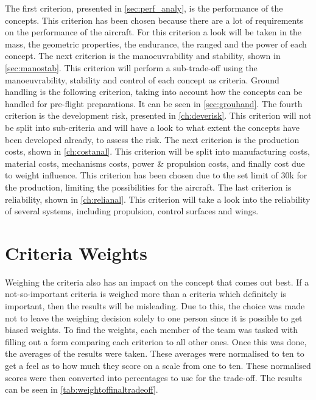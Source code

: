 The first criterion, presented in \autoref{sec:perf_analy}, is the performance of the concepts. This criterion has been chosen because there are a lot of requirements on the performance of the aircraft. For this criterion a look will be taken in the mass, the geometric properties, the endurance, the ranged and the power of each concept. The next criterion is the manoeuvrability and stability, shown in \autoref{sec:manostab}. This criterion will perform a sub-trade-off using the manoeuvrability, stability and control of each concept as criteria. Ground handling is the following criterion, taking into account how the concepts can be handled for pre-flight preparations. It can be seen in \autoref{sec:grouhand}. The fourth criterion is the development risk, presented in \autoref{ch:deverisk}. This criterion will not be split into sub-criteria and will have a look to what extent the concepts have been developed already, to assess the risk. The next criterion is the production costs, shown in \autoref{ch:costanal}. This criterion will be split into manufacturing costs, material costs, mechanisms costs, power \& propulsion costs, and finally cost due to weight influence. This criterion has been chosen due to the set limit of 30k for the production, limiting the possibilities for the aircraft. The last criterion is reliability, shown in \autoref{ch:relianal}. This criterion will take a look into the reliability of several systems, including propulsion, control surfaces and wings.

\section{Criteria Weights}
\label{sec:comp_crit_weig}

Weighing the criteria also has an impact on the concept that comes out best. If a not-so-important criteria is weighed more than a criteria which definitely is important, then the results will be misleading. Due to this, the choice was made not to leave the weighing decision solely to one person since it is possible to get biased weights. To find the weights, each member of the team was tasked with filling out a form comparing each criterion to all other ones. Once this was done, the averages of the results were taken. These averages were normalised to ten to get a feel as to how much they score on a scale from one to ten. These normalised scores were then converted into percentages to use for the trade-off. The results can be seen in \autoref{tab:weightoffinaltradeoff}.

